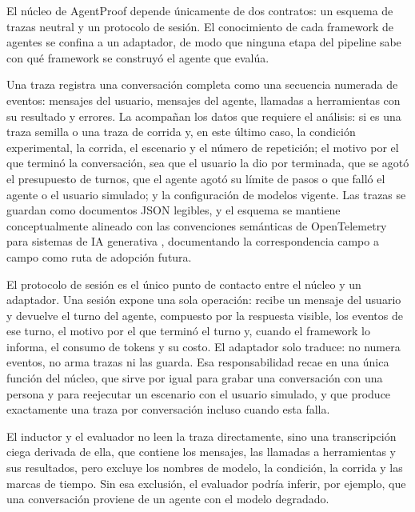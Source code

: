 El núcleo de AgentProof depende únicamente de dos contratos: un esquema de trazas neutral y un protocolo de sesión. El conocimiento de cada framework de agentes se confina a un adaptador, de modo que ninguna etapa del pipeline sabe con qué framework se construyó el agente que evalúa.
\par\vspace{6pt}
Una traza registra una conversación completa como una secuencia numerada de eventos: mensajes del usuario, mensajes del agente, llamadas a herramientas con su resultado y errores. La acompañan los datos que requiere el análisis: si es una traza semilla o una traza de corrida y, en este último caso, la condición experimental, la corrida, el escenario y el número de repetición; el motivo por el que terminó la conversación, sea que el usuario la dio por terminada, que se agotó el presupuesto de turnos, que el agente agotó su límite de pasos o que falló el agente o el usuario simulado; y la configuración de modelos vigente. Las trazas se guardan como documentos JSON legibles, y el esquema se mantiene conceptualmente alineado con las convenciones semánticas de OpenTelemetry para sistemas de IA generativa \cite{otel2026genai}, documentando la correspondencia campo a campo como ruta de adopción futura.
\par\vspace{6pt}
El protocolo de sesión es el único punto de contacto entre el núcleo y un adaptador. Una sesión expone una sola operación: recibe un mensaje del usuario y devuelve el turno del agente, compuesto por la respuesta visible, los eventos de ese turno, el motivo por el que terminó el turno y, cuando el framework lo informa, el consumo de tokens y su costo. El adaptador solo traduce: no numera eventos, no arma trazas ni las guarda. Esa responsabilidad recae en una única función del núcleo, que sirve por igual para grabar una conversación con una persona y para reejecutar un escenario con el usuario simulado, y que produce exactamente una traza por conversación incluso cuando esta falla.
\par\vspace{6pt}
El inductor y el evaluador no leen la traza directamente, sino una transcripción ciega derivada de ella, que contiene los mensajes, las llamadas a herramientas y sus resultados, pero excluye los nombres de modelo, la condición, la corrida y las marcas de tiempo. Sin esa exclusión, el evaluador podría inferir, por ejemplo, que una conversación proviene de un agente con el modelo degradado.
\par

